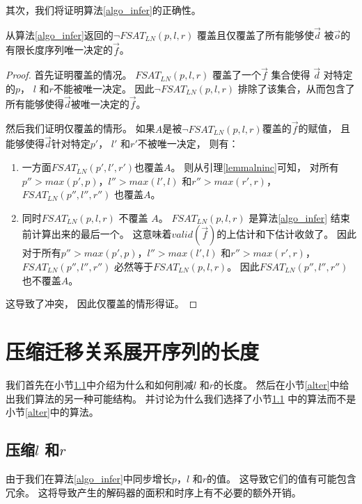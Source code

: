 其次，我们将证明算法\ref{algo_infer}的正确性。

\begin{theorem}
从算法\ref{algo_infer}返回的$\neg FSAT_{LN}(p,l,r)$  覆盖且仅覆盖了所有能够使$\vec{d}$
被$\vec{o}$的有限长度序列唯一决定的$\vec{f}$。
\end{theorem}
\begin{proof}
首先证明覆盖的情况。
$FSAT_{LN}(p,l,r)$ 覆盖了一个$\vec{f}$ 集合使得
$\vec{d}$ 对特定的$p$， $l$ 和$r$不能被唯一决定。
因此$\neg FSAT_{LN}(p,l,r)$ 排除了该集合，从而包含了所有能够使得$\vec{d}$被唯一决定的$\vec{f}$。

然后我们证明仅覆盖的情形。
如果$A$是被$\neg FSAT_{LN}(p,l,r)$覆盖的$\vec{f}$的赋值，
且能够使得$\vec{d}$针对特定$p'$， $l'$ 和$r'$不被唯一决定，
则有：

\begin{enumerate}
 \item 一方面$FSAT_{LN}(p',l',r')$也覆盖$A$。
 则从引理\ref{lemmalninc}可知，
 对所有$p''>max(p',p)$，$l''>max(l',l)$ 和$r''>max(r',r)$，
 $FSAT_{LN}(p'',l'',r'')$ 也覆盖$A$。

 \item 同时$FSAT_{LN}(p,l,r)$ 不覆盖 $A$。
 $FSAT_{LN}(p,l,r)$ 是算法\ref{algo_infer} 结束前计算出来的最后一个。
 这意味着$valid(\vec{f})$的上估计和下估计收敛了。
 因此对于所有$p''>max(p',p)$，$l''>max(l',l)$ 和$r''>max(r',r)$，
 $FSAT_{LN}(p'',l'',r'')$ 必然等于$FSAT_{LN}(p,l,r)$。
 因此$FSAT_{LN}(p'',l'',r'')$ 也不覆盖$A$。
\end{enumerate}

这导致了冲突，
因此仅覆盖的情形得证。
\end{proof}


\section{压缩迁移关系展开序列的长度}\label{sec_min}
我们首先在小节\ref{reduceing_chap3}中介绍为什么和如何削减$l$ 和$r$的长度。
然后在小节\ref{alter}中给出我们算法的另一种可能结构。
并讨论为什么我们选择了小节\ref{reduceing_chap3} 中的算法而不是小节\ref{alter}中的算法。

\subsection{压缩$l$ 和$r$}\label{reduceing_chap3}
由于我们在算法\ref{algo_infer}中同步增长$p$，$l$ 和$r$的值。
这导致它们的值有可能包含冗余。
这将导致产生的解码器的面积和时序上有不必要的额外开销。

